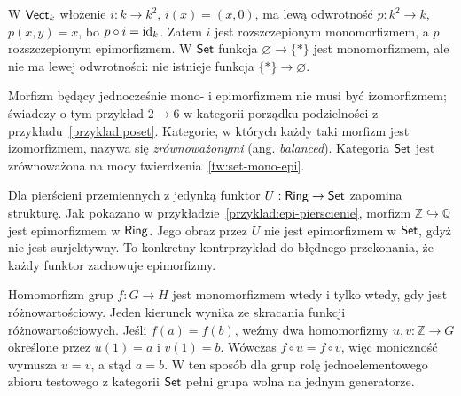 \begin{przyklad}
W $\mathsf{Vect}_k$ włożenie $i:k\to k^2$, $i(x)=(x,0)$, ma lewą odwrotność $p:k^2\to k$, $p(x,y)=x$, bo $p\circ i=\mathrm{id}_k$. Zatem $i$ jest rozszczepionym monomorfizmem, a $p$ rozszczepionym epimorfizmem. W $\mathsf{Set}$ funkcja $\varnothing\to\{*\}$ jest monomorfizmem, ale nie ma lewej odwrotności: nie istnieje funkcja $\{*\}\to\varnothing$.
\end{przyklad}

\begin{uwaga}
Morfizm będący jednocześnie mono- i epimorfizmem nie musi być izomorfizmem; świadczy o tym przykład $2\to6$ w kategorii porządku podzielności z przykładu~\ref{przyklad:poset}. Kategorie, w których każdy taki morfizm jest izomorfizmem, nazywa się \emph{zrównoważonymi} (ang. \emph{balanced}). Kategoria $\mathsf{Set}$ jest zrównoważona na mocy twierdzenia~\ref{tw:set-mono-epi}.
\end{uwaga}


\begin{przyklad}
Dla pierścieni przemiennych z jedynką funktor $U:\mathsf{Ring}\to\mathsf{Set}$ zapomina strukturę. Jak pokazano w przykładzie~\ref{przyklad:epi-pierscienie}, morfizm $\mathbb Z\hookrightarrow\mathbb Q$ jest epimorfizmem w $\mathsf{Ring}$. Jego obraz przez $U$ nie jest epimorfizmem w $\mathsf{Set}$, gdyż nie jest surjektywny. To konkretny kontrprzykład do błędnego przekonania, że każdy funktor zachowuje epimorfizmy.
\end{przyklad}

\begin{przyklad}
Homomorfizm grup $f:G\to H$ jest monomorfizmem wtedy i tylko wtedy, gdy jest różnowartościowy. Jeden kierunek wynika ze skracania funkcji różnowartościowych. Jeśli $f(a)=f(b)$, weźmy dwa homomorfizmy $u,v:\mathbb Z\to G$ określone przez $u(1)=a$ i $v(1)=b$. Wówczas $f\circ u=f\circ v$, więc moniczność wymusza $u=v$, a stąd $a=b$. W ten sposób dla grup rolę jednoelementowego zbioru testowego z kategorii $\mathsf{Set}$ pełni grupa wolna na jednym generatorze.
\end{przyklad}


